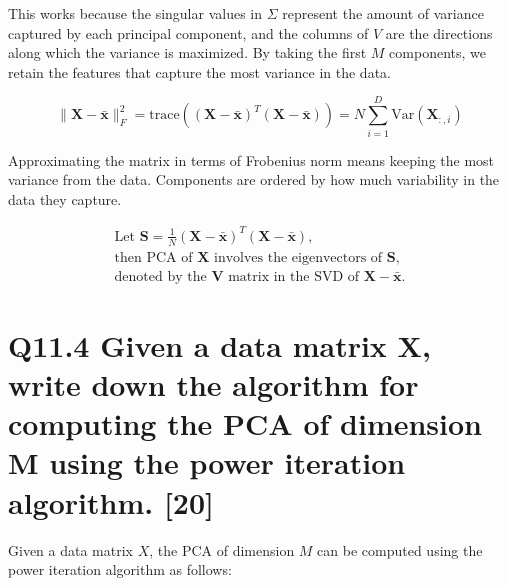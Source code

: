 \documentclass[11pt]{article}
\begin{document}
This works because the singular values in \( \Sigma \) represent the amount of variance captured by each principal component, and the columns of \( V \) are the directions along which the variance is maximized. By taking the first \( M \) components, we retain the features that capture the most variance in the data.

\[
\| \mathbf{X} - \bar{\mathbf{x}} \|_F^2 = \text{trace} \left( (\mathbf{X} - \bar{\mathbf{x}})^T (\mathbf{X} - \bar{\mathbf{x}}) \right) = N \sum_{i=1}^{D} \text{Var}(\mathbf{X}_{:,i})
\]

Approximating the matrix in terms of Frobenius norm means keeping the most variance from the data. Components are ordered by how much variability in the data they capture.

\[
\begin{gathered}
\text{Let } \mathbf{S} = \frac{1}{N} (\mathbf{X} - \bar{\mathbf{x}})^T (\mathbf{X} - \bar{\mathbf{x}}), \\
\text{then PCA of } \mathbf{X} \text{ involves the eigenvectors of } \mathbf{S}, \\
\text{denoted by the } \mathbf{V} \text{ matrix in the SVD of } \mathbf{X} - \bar{\mathbf{x}}.
\end{gathered}
\]

\section{Q11.4 Given a data matrix X, write down the algorithm for computing the PCA of dimension M using the power iteration algorithm. [20]}

Given a data matrix \( X \), the PCA of dimension \( M \) can be computed using the power iteration algorithm as follows:
\end{document}
